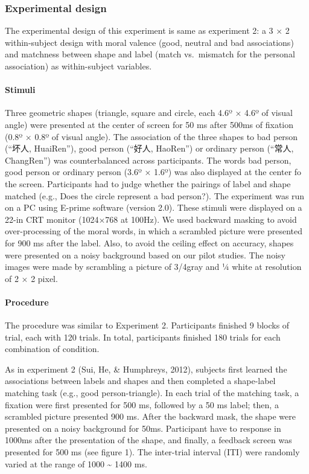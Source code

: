 \documentclass[
  english,
  man]{apa6}
\let\oldparagraph\paragraph
\renewcommand{\paragraph}[1]{\oldparagraph{#1}\mbox{}}
\begin{document}
\hypertarget{experimental-design}{%
\subsubsection{Experimental design}\label{experimental-design}}

The experimental design of this experiment is same as experiment 2: a 3 × 2 within-subject design with moral valence (good, neutral and bad associations) and matchness between shape and label (match vs.~mismatch for the personal association) as within-subject variables.

\hypertarget{stimuli}{%
\paragraph{Stimuli}\label{stimuli}}

Three geometric shapes (triangle, square and circle, each 4.6º × 4.6º of visual angle) were presented at the center of screen for 50 ms after 500ms of fixation (0.8º × 0.8º of visual angle). The association of the three shapes to bad person (\enquote{坏人, HuaiRen}), good person (\enquote{好人, HaoRen}) or ordinary person (\enquote{常人, ChangRen}) was counterbalanced across participants. The words bad person, good person or ordinary person (3.6º × 1.6º) was also displayed at the center fo the screen. Participants had to judge whether the pairings of label and shape matched (e.g., Does the circle represent a bad person?). The experiment was run on a PC using E-prime software (version 2.0). These stimuli were displayed on a 22-in CRT monitor (1024×768 at 100Hz).
We used backward masking to avoid over-processing of the moral words, in which a scrambled picture were presented for 900 ms after the label. Also, to avoid the ceiling effect on accuracy, shapes were presented on a noisy background based on our pilot studies. The noisy images were made by scrambling a picture of 3/4gray and ¼ white at resolution of 2 × 2 pixel.

\hypertarget{procedure-4}{%
\paragraph{Procedure}\label{procedure-4}}

The procedure was similar to Experiment 2. Participants finished 9 blocks of trial, each with 120 trials. In total, participants finished 180 trials for each combination of condition.

As in experiment 2 (Sui, He, \& Humphreys, 2012), subjects first learned the associations between labels and shapes and then completed a shape-label matching task (e.g., good person-triangle). In each trial of the matching task, a fixation were first presented for 500 ms, followed by a 50 ms label; then, a scrambled picture presented 900 ms. After the backward mask, the shape were presented on a noisy background for 50ms. Participant have to response in 1000ms after the presentation of the shape, and finally, a feedback screen was presented for 500 ms (see figure 1). The inter-trial interval (ITI) were randomly varied at the range of 1000 \textasciitilde{} 1400 ms.
\end{document}
